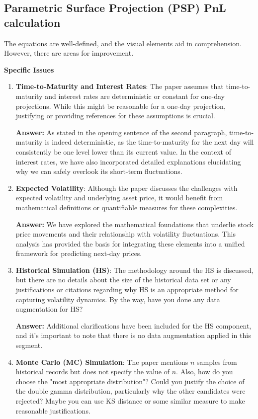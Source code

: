\subsection{Parametric Surface Projection (PSP) PnL calculation}

The equations are well-defined, and the visual elements aid in comprehension. However, there are areas for improvement.

\textbf{Specific Issues}
\begin{enumerate}
    \item \textbf{Time-to-Maturity and Interest Rates}: The paper assumes that time-to-maturity and interest rates are deterministic or constant for one-day projections. While this might be reasonable for a one-day projection, justifying or providing references for these assumptions is crucial.    

    \textbf{Answer:}
    As stated in the opening sentence of the second paragraph, time-to-maturity is indeed deterministic, as the time-to-maturity for the next day will consistently be one level lower than its current value. In the context of interest rates, we have also incorporated detailed explanations elucidating why we can safely overlook its short-term fluctuations.
    
    \item \textbf{Expected Volatility}: Although the paper discusses the challenges with expected volatility and underlying asset price, it would benefit from mathematical definitions or quantifiable measures for these complexities.    

    \textbf{Answer:}
    We have explored the mathematical foundations that underlie stock price movements and their relationship with volatility fluctuations. This analysis has provided the basis for integrating these elements into a unified framework for predicting next-day prices.
    
    \item \textbf{Historical Simulation (HS)}: The methodology around the HS is discussed, but there are no details about the size of the historical data set or any justifications or citations regarding why HS is an appropriate method for capturing volatility dynamics. By the way, have you done any data augmentation for HS?

    \textbf{Answer:}
    Additional clarifications have been included for the HS component, and it's important to note that there is no data augmentation applied in this segment.
    
    \item \textbf{Monte Carlo (MC) Simulation}: The paper mentions $n$ samples from historical records but does not specify the value of $n$. Also, how do you choose the "most appropriate distribution"? Could you justify the choice of the double gamma distribution, particularly why the other candidates were rejected? Maybe you can use KS distance or some similar measure to make reasonable justifications.


\end{enumerate}
